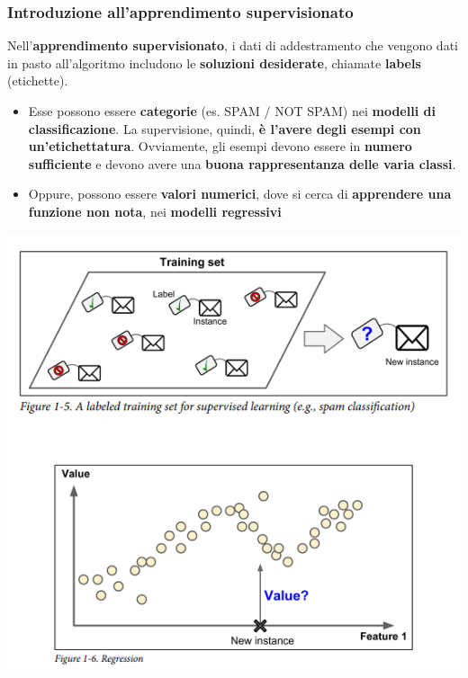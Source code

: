 \documentclass[12pt]{article}
\begin{document}
\subsubsection{Introduzione all'apprendimento supervisionato}
Nell'\textbf{apprendimento supervisionato}, i dati di addestramento che vengono dati in pasto all'algoritmo includono le \textbf{soluzioni desiderate}, chiamate \textbf{labels} (etichette).
\begin{itemize}
    \item Esse possono essere \textbf{categorie} (es. SPAM / NOT SPAM) nei \textbf{modelli di classificazione}. La supervisione, quindi, \textbf{è l'avere degli esempi con un'etichettatura}. Ovviamente, gli esempi devono essere in \textbf{numero sufficiente} e devono avere una \textbf{buona rappresentanza delle varia classi}.
    \item Oppure, possono essere \textbf{valori numerici}, dove si cerca di \textbf{apprendere una funzione non nota}, nei \textbf{modelli regressivi} 
\end{itemize}
\begin{center}
    \includegraphics[width =0.65\linewidth]{Images/60.PNG}
\end{center}
\end{document}
